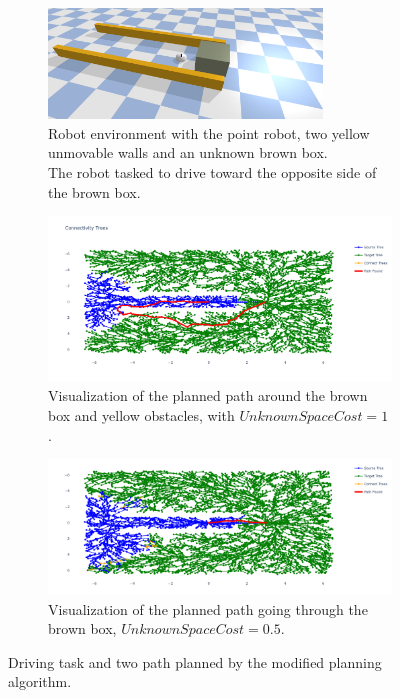 \begin{figure}[H]
    \centering
    \begin{subfigure}{\textwidth}
    \centering
    \includegraphics[width=0.8\textwidth]{figures/required_background/push_or_drive} \caption{Robot environment with the point robot, two yellow unmovable walls and an unknown brown box.\\The robot tasked to drive toward the opposite side of the brown box.}


    \end{subfigure}

    \begin{subfigure}{1.11\textwidth}
    \centering
    \includegraphics[width=\textwidth]{figures/required_background/mp/mp_high_fixed_cost}
    \caption{Visualization of the planned path around the brown box and yellow obstacles, with $\mathit{UnknownSpaceCost} = 1$.}
    \end{subfigure}

    \begin{subfigure}{1.11\textwidth}
    \centering
    \includegraphics[width=\textwidth]{figures/required_background/mp/mp_low_fixed_cost}
    \caption{Visualization of the planned path going through the brown box, $\mathit{UnknownSpaceCost} = 0.5$.}
    \end{subfigure}
    \caption{Driving task and two path planned by the modified planning algorithm.}%
    \label{fig:mp_push_or_drive}
\end{figure}

